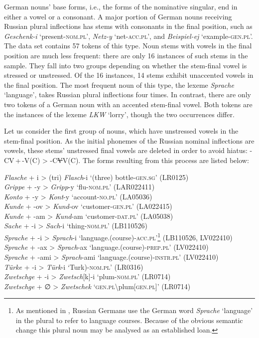 German nouns’ base forms, i.e., the forms of the nominative singular, end in either a vowel or a consonant. A major portion of German nouns receiving Russian plural inflections has stems with consonants in the final position, such as \textit{Geschenk-i} `present-\textsc{nom.pl}', \textit{Netz-y} `net-\textsc{acc.pl}', and \textit{Beispiel-ej} `example-\textsc{gen.pl}'. The data set contains 57 tokens of this type. Noun stems with vowels in the final position are much less frequent: there are only 16 instances of such stems in the sample. They fall into two groups depending on whether the stem-final vowel is  stressed or unstressed. Of the 16 instances, 14 stems exhibit unaccented vowels in the final  position. The most frequent noun of this type, the lexeme \textit{Sprache} `language', takes Russian plural inflections four times. In contrast, there are only two tokens of a German noun with an accented stem-final vowel. Both tokens are the instances of the lexeme \textit{LKW} `lorry', though the two occurrences differ.

Let us consider the first group of nouns, which have unstressed vowels in the stem-final position. As the initial phonemes of the Russian nominal inflections are vowels, these stems’ unstressed final vowels are deleted in order to avoid hiatus: -CV\,+\,-V(C) > -C\sout{V}V(C). The forms resulting from this process are listed below:

\ea
\label{ex:6:18}
\textit{Flasche} + i > (tri) \textit{Flasch}-i `(three) bottle-\textsc{gen.sg}' (LR0125)\\
\textit{Grippe} + -y > \textit{Gripp}-y `flu-\textsc{nom.pl}' (LAR022411)\\
\textit{Konto} + -y > \textit{Kont}-y `account-\textsc{no.pl}' (LA05036)\\
\textit{Kunde} + -ov > \textit{Kund}-ov `customer-\textsc{gen.pl}' (LA022415)\\ 
\textit{Kunde} + -am > \textit{Kund}-am `customer-\textsc{dat.pl}' (LA05038)\\
\textit{Sache} + -i > \textit{Sach}-i `thing-\textsc{nom.pl}' (LB110526)\\
\textit{Sprache} + -i > \textit{Sprach}-i `language.(course)-\textsc{acc.pl}'\footnote{As mentioned in , Russian Germans use the German word \textit{Sprache} ‘language’ in the plural to refer to language courses. Because of the obvious semantic change this plural noun may be analysed as an established loan.} (LB110526, LV022410)\\
\textit{Sprache} + -ax > \textit{Sprach}-ax `language.(course)-\textsc{prep.pl}' (LV022410)\\
\textit{Sprache} + -ami > \textit{Sprach}-ami `language.(course)-\textsc{instr.pl}' (LV022410)\\
\textit{Türke} + -i > \textit{Türk}-i `Turk)-\textsc{nom.pl}' (LR0316)\\
\textit{Zwetschge} + -i > \textit{Zwetsch}[k]-i `plum-\textsc{nom.pl}' (LR0714)\\
\textit{Zwetschge} + ∅{} > \textit{Zwetschek} `\textsc{gen.pl}\textbackslash plum[\textsc{gen.pl}]' (LR0714)\\
\z


